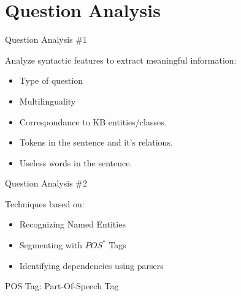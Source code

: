 \documentclass{beamer}
\begin{document}
\note{}

\section{Question Analysis}

\begin{frame}{Question Analysis \#1}
  \begin{card}
    Analyze syntactic features to extract meaningful information:
    \begin{itemize}
      \item Type of question
      \item Multilinguality
      \item Correspondance to KB entities/classes.
      \item Tokens in the sentence and it's relations.
      \item Useless words in the sentence.
    \end{itemize}
  \end{card}
\end{frame}


\begin{frame}{Question Analysis \#2}
  \begin{card}
    Techniques based on:
    \begin{itemize}
      \item Recognizing Named Entities
      \item Segmenting with $POS^{*}$ Tags
      \item Identifying dependencies using parsers
    \end{itemize}
  \end{card}
  \vspace{8em}
  POS Tag: Part-Of-Speech Tag
\end{frame}

\end{document}
